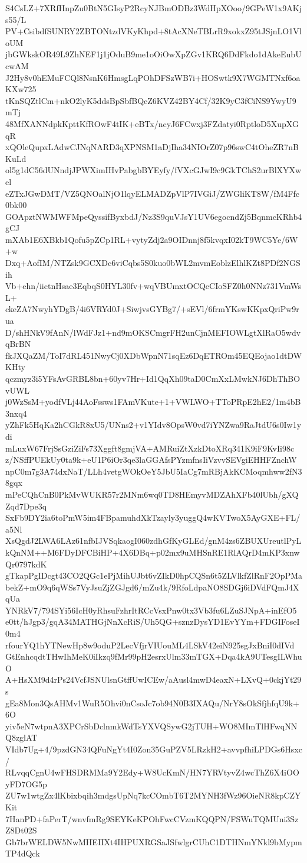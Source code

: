 S4CsLZ+7XRfHnpZu0BtN5GIsyP2RcyNJBmODBz3WdHpXOoo/9GPeW1x9AKjs55/L
PV+CsibdfSUNRY2ZBTONtzdVKyKhpd+8tAcXNeTBLrR9xokxZ95tJSjnLO1VloUM
jbGWkskOR49L9ZhNEF1j1jOduB9me1oOiOwXpZGv1KRQ6DdFkdo1dAkeEubUcwAM
J2Hy8v0hEMuFCQl8NsnK6HmsgLqPOhDFSzWB7i+HOSwtk9X7WGMTNxf6oaKXw725
tKnSQZtlCm+nkO2lyK5ddsBpSbfBQcZ6KVZ42BY4Cf/32K9yC3fCiNS9YwyU9mTj
48MfXANNdpkKpttKfROwF4tIK+eBTx/ncyJ6FCwxj3FZdatyi0RptloD5XupXGqR
xQOleQupxLAdwCJNqNARD3qXPNSM1aDjIha34NIOrZ07p96swC4tOheZR7nBKuLd
ol5g1dC56dUNndjJPWXimIHvPabgbBYEyfy/fVXcGJwI9c9GkTChS2urBlXYXwel
eZTxJGwDMT/VZ5QNOalNjO1lqyELMADZpVlP7IVGiJ/ZWGliKT8W/fM4Ffc0bk00
GOApztNWMWFMpeQyssifByxbdJ/Nz3S9quVJsY1UV6egocndZj5BqnmcKRhb4gCJ
mXAb1E6XBkb1Qofu5pZCp1RL+vytyZdj2a9OIDnnj8f5kvqxI02kT9WC5Ye/6W+w
Dxq+AofIM/NTZsk9GCXDc6viCqbs5S0kuo0bWL2mvmEoblzElhlKZt8PDf2NGSih
Vb+ehn/iictnHsae3EqbqS0HYL30fv+wqVBUmxtOCQeCIoSFZ0h0NNz731VmWsL+
ckeZA7NwyhYDgB/4i6VRYd0J+SiwjvsGYBg7/+sEVl/6frmYKswKKpxQriPw9rua
D/shHNkV9fAnN/lWdFJz1+nd9mOKSCmgrFH2unCjnMEFIOWLgtXlRaO5wdvqBrBN
fkJXQaZM/ToI7dRL451NwyCj0XDbWpnN71sqEz6DqETROm45EQEojao1dtDWKHty
qczmyz3i5YFsAvGRBL8bn+60yv7Hr+Id1QqXh09taD0CmXxLMwkNJ6DhThBOvUWL
j0WzSsM+yodfVLj44AoFssws1FAmVKute+1+VWLWO+TToPRpE2hE2/1m4bB3nxq4
yZhFk5HqKa2hCGkR8xU5/UNns2+v1YIdv8OpsW0vd7iYNZwa9RaJtdU6s0Iw1ydi
mLuxW67FrjSsGziZiFs73Xggft8gmjVA+AMRuiZtXzkDtoXRq341K9iF9KvIi98c
z/NSffPUEkUy0ta9k+eU1P6iOr3qe3laGGAfsPYzmfnsIiVzvvSEVgiEHHFZnchW
npC0m7g3A74dxNaT/LLh4vetgWOkOeY5JbU5IaCg7mRBjAkKCMoqmhww2fN38gqx
mPeCQhCnB0PkMvWUKR57r2MNm6wq0TD8HEmyvMDZAhXFb40lUbh/gXQZqd7Dpe3q
SxFb9DY2ia6toPmW5im4FBpamuhdXkTzayly3yuggQ4wKVTwoX5AyGXE+FL/a5Nl
XsQgdJ2LWA6LAz61nfbIJVSqkaogI060zdhGfKyGLEd/gnM4zs6ZBUXUreutlPyL
kQnNM++M6FDyDFCBiHP+4X6DBq+p02mx9uMHSnRE1RlAQrD4mKP3xnwQr0797kdK
gTkapPgIDcgt43CO2QGc1ePjMihUJbt6vZIkD0hpCQSn6t5ZLVlkfZlRnF2OpPMa
bekZ+mO9q6qWSs7VyJsuZjZGJgd6/mZu4k/9RfoLdpaNO8SDGj6iDVdFQmJ4XqUa
YNRkV7/794SYi56IcH0yRhsuFzhrItRCcVsxPnw0tx3Vb3fu6LZuSJNpA+inEfO5
e0tt/hJgp3/gqA34MATHGjNnXcRiS/Uh5QG+sznzDysYD1EvYYm+FDGIFoseI0m4
rfourYQ1hYTNewHp8w9oduP2LecVfjrVIUouML4LSkV42eiN925sgJxBniI0dIVd
GtEnhcqdtTHwIhMeK0iIkzq9fMr99pH2esrxUlm33mTGX+Dqa4kA9UTesgILWhuO
A+HsXM9d4rPs24VcfJSNUlsnGtffUwICEw/aAusl4mwD4eaxN+LXvQ+0ckjYt29s
gEa8Mon3QsAHMv1WuR5Ohvi0nCsoJc7ob94N0B3IXAQu/NrY8sOkSfjhfqU9k+6O
yiv5eN7wtpnA3XPCrSbDclnmkWdTsYXVQSywG2jTUH+WO8MImTlHFwqNNQ8zglAT
VIdb7Ug+4/9pzdGN34QFuNgYt4I0Zon35GuPZV5LRzkH2+avvpfhiLPDGs6Hsxc/
RLvqqCgnU4wFHSDRMMa9Y2Edy+W8UcKmN/HN7YRVtyvZ4wcThZ6X4iOOyFD7OG5p
ZU7w1wtgZx4lKbixbqih3mdgsUpNq7kcCOmbT6T2MYNH3fWz96OieNR8kpCZYKit
7HanPD+faPerT/wnvfmRg9SEYKeKPOhFwcCVzmKQQPN/FSWuTQMUni3SzZ8Dt02S
Gb7brWELDW5NwMHEIIXt4IHPUXRGSaJSfwlgrCUhC1DTHNmYNkl9bMypmTP4dQck
